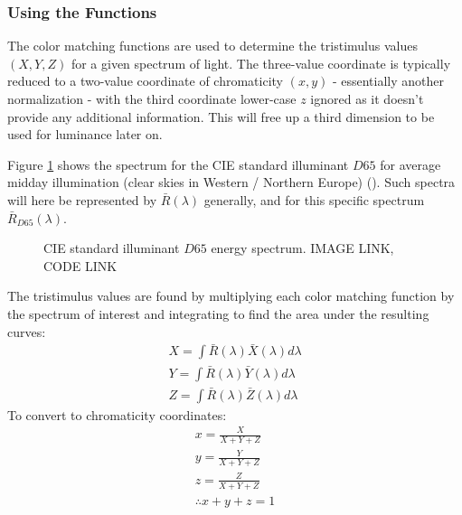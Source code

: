 \documentclass[twocolumn]{article}
\newif\ifinvert
\begin{document}
\subsubsection{Using the Functions}
The color matching functions are used to determine the tristimulus values $(X,Y,Z)$ for a given spectrum of light.  The three-value coordinate is typically reduced to a two-value coordinate of chromaticity $(x,y)$ - essentially another normalization - with the third coordinate lower-case $z$ ignored as it doesn't provide any additional information.  This will free up a third dimension to be used for luminance later on.

Figure \ref{fig:d65_spectrum} shows the spectrum for the CIE standard illuminant $D65$ for average midday illumination (clear skies in Western / Northern Europe) (\cite{judd1964spectral}).  Such spectra will here be represented by $\bar{R}(\lambda)$ generally, and for this specific spectrum $\bar{R}_{D65}(\lambda)$.
\begin{figure}[h]
    \ifinvert
        
    \else
        
    \fi
    \caption{CIE standard illuminant $D65$ energy spectrum.  IMAGE LINK, CODE LINK}\label{fig:d65_spectrum}
\end{figure}
The tristimulus values are found by multiplying each color matching function by the spectrum of interest and integrating to find the area under the resulting curves:
\begin{equation}\label{eq:tristimulus_from_spectrum}
    \begin{aligned}
        X=\int\bar{R}(\lambda)\bar{X}(\lambda)d\lambda\\
        Y=\int\bar{R}(\lambda)\bar{Y}(\lambda)d\lambda\\
        Z=\int\bar{R}(\lambda)\bar{Z}(\lambda)d\lambda
    \end{aligned}
\end{equation}
To convert to chromaticity coordinates:
\begin{equation}\label{eq:chromaticity_from_tristimulus}
    \begin{aligned}
        x=\frac{X}{X+Y+Z}\\
        y=\frac{Y}{X+Y+Z}\\
        z=\frac{Z}{X+Y+Z}\\
        \therefore x+y+z=1
    \end{aligned}
\end{equation}
\end{document}
